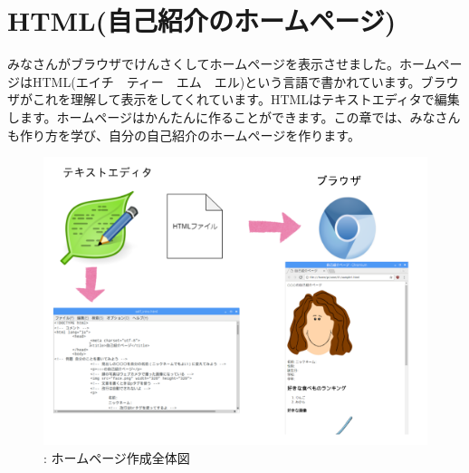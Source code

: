 \documentclass[a4paper,12pt]{jarticle}
\begin{document}
\section{HTML(自己紹介のホームページ)}
みなさんがブラウザでけんさくしてホームページを表示させました。ホームページはHTML(エイチ　ティー　エム　エル)という言語で書かれています。ブラウザがこれを理解して表示をしてくれています。HTMLはテキストエディタで編集します。ホームページはかんたんに作ることができます。この章では、みなさんも作り方を学び、自分の自己紹介のホームページを作ります。


\bigskip


\bigskip


\bigskip


\bigskip



\begin{figure}[hb]
  \centering
  \begin{minipage}{15.801cm}
    {\upshape
      \includegraphics[width=15.801cm]{textbook-img140.png}
      \newline
      : ホームページ作成全体図}
  \end{minipage}
\end{figure}
\clearpage
\end{document}

